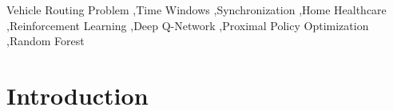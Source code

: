 \documentclass[preprint,12pt]{elsarticle}
\begin{document}
\begin{frontmatter}
\begin{keyword}
Vehicle Routing Problem \sep Time Windows \sep Synchronization \sep Home Healthcare \sep Reinforcement Learning \sep Deep Q-Network \sep Proximal Policy Optimization \sep Random Forest
\end{keyword}

\end{frontmatter}

\section{Introduction}
\label{sec:intro}

% 
%
%
%
%
\end{document}
